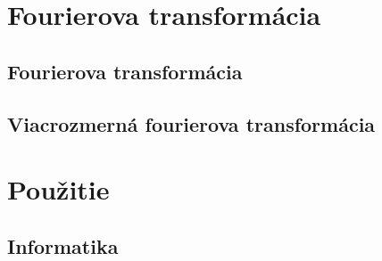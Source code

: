 %
%


\chapter{Fourierova transformácia}
    
    
    
    
\section{Fourierova transformácia}
\section{Viacrozmerná fourierova transformácia}
    

%    
%    
%    
%    
%    
%    
%    
%    
%    
%    

\chapter{Použitie}
%    
%    
%    
%    
%    
         
%    
%    
%    
%    
    
\section{Informatika}
    
    
    
    
    
    
    
    
